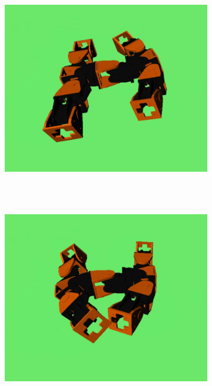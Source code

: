 \begin{figure}[h]
\begin{subfigure}[b]{0.25\textwidth}
                 \\~
        \end{subfigure}
        ~
        \begin{subfigure}[b]{0.25\textwidth}
         	   \centering
                \includegraphics[width=\textwidth]{images/results_11_gait_03.png}
                 \\~
        \end{subfigure}
        ~
        \begin{subfigure}[b]{0.25\textwidth}
         	   \centering
                \includegraphics[width=\textwidth]{images/results_11_gait_04.png}

\end{subfigure}
\end{figure}

